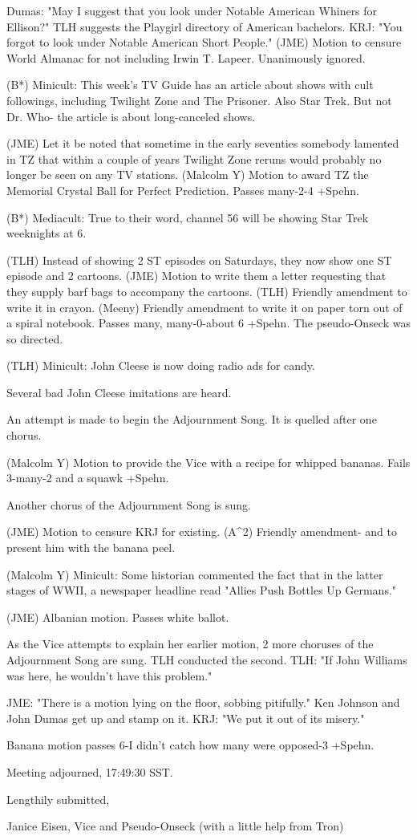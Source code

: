 \documentclass[12pt]{article}
\begin{document}
Dumas: "May I suggest that you look under Notable American Whiners for Ellison?" TLH suggests the Playgirl directory of American bachelors. KRJ: "You forgot to look under Notable American Short People." (JME) Motion to censure World Almanac for not including Irwin T. Lapeer. Unanimously ignored.

(B*) Minicult: This week's TV Guide has an article about shows with cult followings, including Twilight Zone and The Prisoner. Also Star Trek. But not Dr. Who- the article is about long-canceled shows.

(JME) Let it be noted that sometime in the early seventies somebody lamented in TZ that within a couple of years Twilight Zone reruns would probably no longer be seen on any TV stations. (Malcolm Y) Motion to award TZ the Memorial Crystal Ball for Perfect Prediction. Passes many-2-4 +Spehn.

(B*) Mediacult: True to their word, channel 56 will be showing Star Trek weeknights at 6.

(TLH) Instead of showing 2 ST episodes on Saturdays, they now show one ST episode and 2 cartoons. (JME) Motion to write them a letter requesting that they supply barf bags to accompany the cartoons. (TLH) Friendly amendment to write it in crayon. (Meeny) Friendly amendment to write it on paper torn out of a spiral notebook. Passes many, many-0-about 6 +Spehn. The pseudo-Onseck was so directed.

(TLH) Minicult: John Cleese is now doing radio ads for candy.

Several bad John Cleese imitations are heard.

An attempt is made to begin the Adjournment Song. It is quelled after one chorus.

(Malcolm Y) Motion to provide the Vice with a recipe for whipped bananas. Fails 3-many-2 and a squawk +Spehn.

Another chorus of the Adjournment Song is sung.

(JME) Motion to censure KRJ for existing. (A^2) Friendly amendment- and to present him with the banana peel.

(Malcolm Y) Minicult: Some historian commented the fact that in the latter stages of WWII, a newspaper headline read "Allies Push Bottles Up Germans."

(JME) Albanian motion. Passes white ballot.

As the Vice attempts to explain her earlier motion, 2 more choruses of the Adjournment Song are sung. TLH conducted the second. TLH: "If John Williams was here, he wouldn't have this problem."

JME: "There is a motion lying on the floor, sobbing pitifully." Ken Johnson and John Dumas get up and stamp on it. KRJ: "We put it out of its misery."

Banana motion passes 6-I didn't catch how many were opposed-3 +Spehn.

\vspace{12pt}

\noindent
Meeting adjourned, 17:49:30 SST.

\vspace{18pt}

\centerline{Lengthily submitted,}
\centerline{Janice Eisen, Vice and Pseudo-Onseck (with a little help from Tron)}
\end{document}

